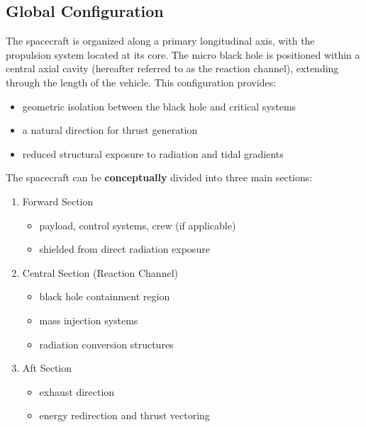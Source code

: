\documentclass[conference]{IEEEtran}
\begin{document}
\subsection{Global Configuration}
The spacecraft is organized along a primary longitudinal axis, with the propulsion system located at its core. The micro black hole is positioned within a central axial cavity (hereafter referred to as the reaction channel), extending through the length of the vehicle. This configuration provides:
\begin{itemize}
\item geometric isolation between the black hole and critical systems
\item a natural direction for thrust generation
\item reduced structural exposure to radiation and tidal gradients
\end{itemize}
The spacecraft can be \textbf{conceptually} divided into three main sections:
\begin{enumerate}
\item Forward Section\begin{itemize}\item payload, control systems, crew (if applicable)\item shielded from direct radiation exposure\end{itemize}
\item Central Section (Reaction Channel)\begin{itemize}\item black hole containment region\item mass injection systems\item radiation conversion structures\end{itemize}
\item Aft Section\begin{itemize}\item exhaust direction\item energy redirection and thrust vectoring\end{itemize}
\end{enumerate}
\end{document}
